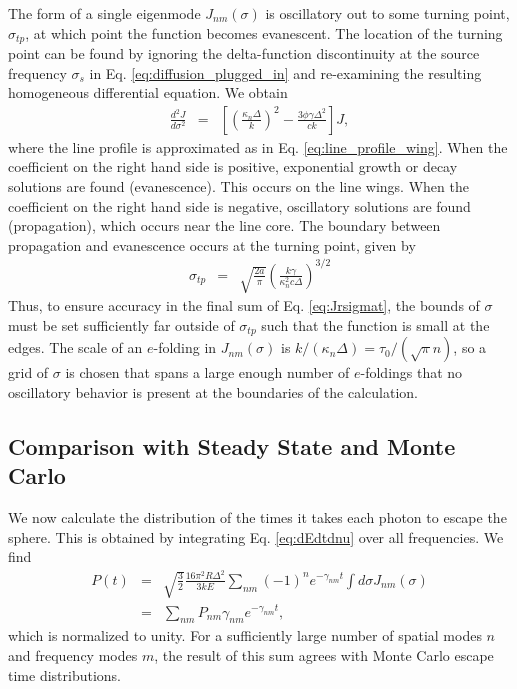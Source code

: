 \documentclass{aastex63}
\newcommand{\be}{\begin{eqnarray}}
\newcommand{\ee}{\end{eqnarray}}
\begin{document}
The form of a single eigenmode $J_{nm}(\sigma)$ is oscillatory out to some turning point, $\sigma_{tp}$, at which point the function becomes evanescent. The location of the turning point can be found by ignoring the delta-function discontinuity at the source frequency $\sigma_s$ in Eq. \ref{eq:diffusion_plugged_in} and re-examining the resulting homogeneous differential equation. We obtain
\be \label{eq:wkb_differential_eqn}
\frac{d^2J}{d\sigma^2} & = & \left[ \left( \frac{\kappa_n \Delta }{k} \right)^2 - \frac{3\phi \gamma\Delta^2}{ck}\right] J,
\ee
where the line profile is approximated as in Eq. \ref{eq:line_profile_wing}. When the coefficient on the right hand side is positive, exponential growth or decay solutions are found (evanescence). This occurs on the line wings. When the coefficient on the right hand side is negative, oscillatory solutions are found (propagation), which occurs near the line core. The boundary between propagation and evanescence occurs at the turning point, given by
\be \label{eq:sigma_tp}
\sigma_{tp} & = & \sqrt{\frac{2a}{\pi}}\left( \frac{k \gamma}{ \kappa_n^2 c \Delta} \right)^{3/2}
\ee
Thus, to ensure accuracy in the final sum of Eq. \ref{eq:Jrsigmat}, the bounds of $\sigma$ must be set sufficiently far outside of $\sigma_{tp}$ such that the function is small at the edges. The scale of an $e$-folding in $J_{nm}(\sigma)$ is $k/(\kappa_n \Delta) = \tau_0 / (\sqrt{\pi} n)$, so a grid of $\sigma$ is chosen that spans a large enough number of $e$-foldings that no oscillatory behavior is present at the boundaries of the calculation.

\subsection{Comparison with Steady State and Monte Carlo}

We now calculate the distribution of the times it takes each photon to escape the sphere. This is obtained by integrating Eq. \ref{eq:dEdtdnu} over all frequencies. We find
\be
P(t)  & = & \sqrt{\frac{3}{2}} \frac{16\pi^2 R \Delta^2 }{3kE}     \sum_{nm} (-1)^n  e^{-\gamma_{nm}t} \int d\sigma J_{nm}(\sigma) 
\nonumber \\ & = &  \sum_{nm} P_{nm} \gamma_{nm} e^{-\gamma_{nm}t},
\label{eq:waittime}
\ee
which is normalized to unity. For a sufficiently large number of spatial modes $n$ and frequency modes $m$, the result of this sum agrees with Monte Carlo escape time distributions. %
\end{document}
